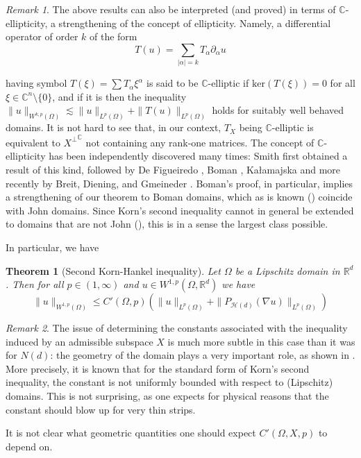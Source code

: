 \documentclass[11pt, a4paper, reqno]{elsarticle}
\newtheorem{theorem}{Theorem}[section]
\theoremstyle{definition}
\theoremstyle{remark}
\newtheorem{remark}{Remark}
\begin{document}
\begin{remark}
    The above results can also be interpreted (and proved) in terms
    of $\mathbb C$-ellipticity, a strengthening of
    the concept of ellipticity. Namely, a differential operator
    of order $k$ of the form
    \begin{equation*}
        T(u)=\sum_{|\alpha|=k}
        T_\alpha \partial_\alpha u
    \end{equation*}
    
    having symbol $T(\xi)=\sum
    T_\alpha \xi^\alpha$ is
    said to be $\mathbb{C}$-elliptic if 
    $\mathrm{ker}(T(\xi))=0$
    for all $\xi\in \mathbb{C}^n\setminus \{0\}$,
    and if it is then the inequality 
    $\|u\|_{W^{k,p}(\Omega)}\lesssim \|u\|_{L^p(\Omega)}+\|T(u)\|_{L^p
    (\Omega)}$ holds
    for suitably well behaved domains. It is not 
    hard to see that, in our context, $T_X$ being $\mathbb{C}$-elliptic
    is equivalent to ${X^\perp}^\mathbb{C}$ not containing 
    any rank-one matrices. The concept of $\mathbb C$-ellipticity
    has been independently discovered many times:
    Smith \cite{smith1961inequalities}
    first obtained a result of this kind, followed by 
    De Figueiredo \cite{DeFigueiredo}, Boman \cite{Boman},
    Kałamajska \cite{Kalamajska} and more recently
    by Breit, Diening, and Gmeineder \cite{Gmeineder}.
    Boman's proof, in particular, implies a strengthening of our 
    theorem to Boman domains, which as is known (\cite{BomanJohn}) coincide
    with John domains. Since Korn's 
    second inequality cannot in general be extended to domains that are not John (\cite{JohnKorn}), this is in a sense the
    largest class possible.
\end{remark}
In particular, we have
\begin{theorem}[Second Korn-Hankel inequality]
    Let $\Omega$ be a Lipschitz domain in $\mathbb{R}^d$. 
   Then for all $p\in(1,\infty)$
   and $u\in W^{1,p}(\Omega, \mathbb{R}^d)$
   we have
    \begin{equation*}
        \|u\|_{W^{1,p}(\Omega)}
\le
	C'(\Omega, p)
	\left(
		\|u\|_{L^p(\Omega)}
	+
		\|P_{\mathcal H(d)}(\nabla u)\|_{L^p(\Omega)}
	\right)
    \end{equation*}
\end{theorem}
\begin{remark}
	The issue of determining the constants
	associated with the inequality induced by 
	an admissible subspace $X$ is much more subtle
	in this case than it was for $N(d)$: the geometry
	of the domain plays a very important role, as shown in
	 \cite{Lewicka2016OnConditions}. More precisely,
	it is known that for the standard form of Korn's 
    second inequality, 
	the constant is not uniformly bounded with respect to
	(Lipschitz) domains. This is not surprising,
    as one expects for physical reasons that
    the constant should blow up for very thin strips.\par
    It is not clear what geometric quantities
    one should expect $C'(\Omega, X,p)$ to depend on.
\end{remark}
\end{document}
